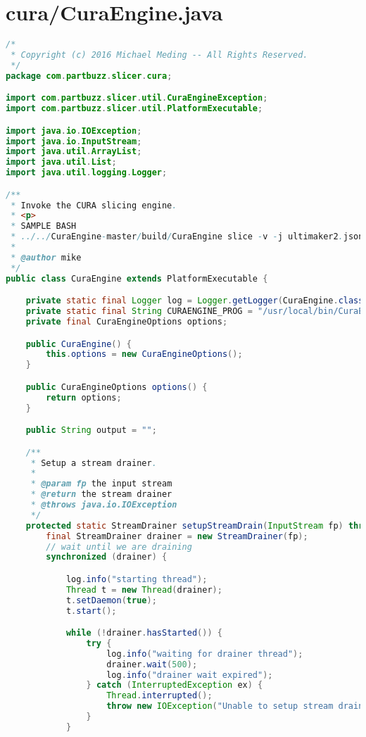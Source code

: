 \section{cura/CuraEngine.java}
\begin{lstlisting}[language=Java, label={lst:CuraEngine}, caption=CuraEngine.java is the main code that preforms slicing throgh the CuraEngine C++ executable.]
/*
 * Copyright (c) 2016 Michael Meding -- All Rights Reserved.
 */
package com.partbuzz.slicer.cura;

import com.partbuzz.slicer.util.CuraEngineException;
import com.partbuzz.slicer.util.PlatformExecutable;

import java.io.IOException;
import java.io.InputStream;
import java.util.ArrayList;
import java.util.List;
import java.util.logging.Logger;

/**
 * Invoke the CURA slicing engine.
 * <p>
 * SAMPLE BASH
 * ../../CuraEngine-master/build/CuraEngine slice -v -j ultimaker2.json -g -e -o "output/test.gcode" -l ../../models/ControlPanel.stl
 *
 * @author mike
 */
public class CuraEngine extends PlatformExecutable {

    private static final Logger log = Logger.getLogger(CuraEngine.class.getName());
    private static final String CURAENGINE_PROG = "/usr/local/bin/CuraEngine";
    private final CuraEngineOptions options;

    public CuraEngine() {
        this.options = new CuraEngineOptions();
    }

    public CuraEngineOptions options() {
        return options;
    }

    public String output = "";

    /**
     * Setup a stream drainer.
     *
     * @param fp the input stream
     * @return the stream drainer
     * @throws java.io.IOException
     */
    protected static StreamDrainer setupStreamDrain(InputStream fp) throws IOException {
        final StreamDrainer drainer = new StreamDrainer(fp);
        // wait until we are draining
        synchronized (drainer) {

            log.info("starting thread");
            Thread t = new Thread(drainer);
            t.setDaemon(true);
            t.start();

            while (!drainer.hasStarted()) {
                try {
                    log.info("waiting for drainer thread");
                    drainer.wait(500);
                    log.info("drainer wait expired");
                } catch (InterruptedException ex) {
                    Thread.interrupted();
                    throw new IOException("Unable to setup stream drainer");
                }
            }


\end{lstlisting}
